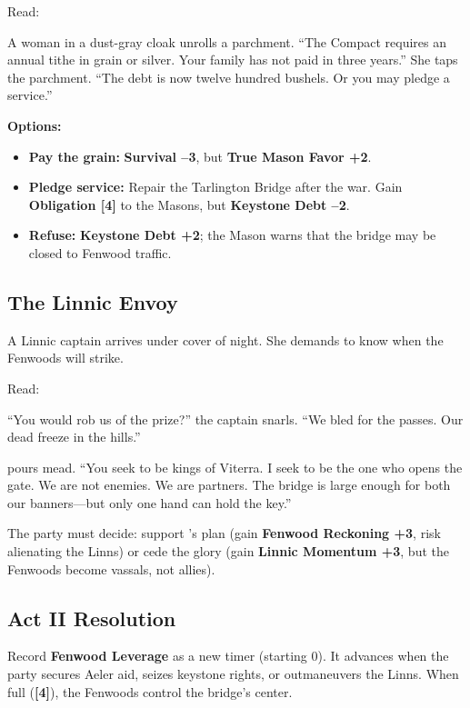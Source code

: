 \documentclass[11pt,a5paper]{book}
\newcommand{\timer}[1]{\textbf{[#1]}}
\begin{document}
Read:
\begin{quoting}
A woman in a dust-gray cloak unrolls a parchment. ``The Compact requires an annual tithe in grain or silver. Your family has not paid in three years.'' She taps the parchment. ``The debt is now twelve hundred bushels. Or you may pledge a service.''
\end{quoting}

\textbf{Options:}
\begin{itemize}[leftmargin=*]
\item \textbf{Pay the grain:} \textbf{Survival --3}, but \textbf{True Mason Favor +2}.
\item \textbf{Pledge service:} Repair the Tarlington Bridge after the war. Gain \textbf{Obligation \timer{4}} to the Masons, but \textbf{Keystone Debt --2}.
\item \textbf{Refuse:} \textbf{Keystone Debt +2}; the Mason warns that the bridge may be closed to Fenwood traffic.
\end{itemize}

\subsection*{The Linnic Envoy}

A Linnic captain arrives under cover of night. She demands to know when the Fenwoods will strike.

Read:
\begin{quoting}
``You would rob us of the prize?'' the captain snarls. ``We bled for the passes. Our dead freeze in the hills.''

\aldric{} pours mead. ``You seek to be kings of Viterra. I seek to be the one who opens the gate. We are not enemies. We are partners. The bridge is large enough for both our banners---but only one hand can hold the key.''
\end{quoting}

The party must decide: support \aldric's plan (gain \textbf{Fenwood Reckoning +3}, risk alienating the Linns) or cede the glory (gain \textbf{Linnic Momentum +3}, but the Fenwoods become vassals, not allies).

\subsection*{Act II Resolution}

Record \textbf{Fenwood Leverage} as a new timer (starting 0). It advances when the party secures Aeler aid, seizes keystone rights, or outmaneuvers the Linns. When full (\timer{4}), the Fenwoods control the bridge's center.
\end{document}
